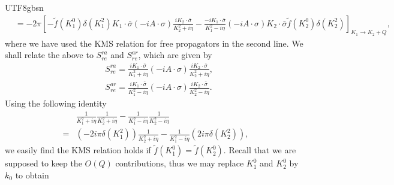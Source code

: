 \documentclass[11pt]{article}\def\baselinestretch{1.4}
\def\d{{\delta}}
\def\h{\eta}
\def\p{{\pi}}
\def\s{{\sigma}}
\def\({\left(}
\def\){\right)}
\begin{document}
\begin{CJK}{UTF8}{gbsn}
\begin{align}
&=-2\p\left[-\tilde{f}(K_1^0)\d(K_1^2)K_1\cdot\bar{\s}(-iA\cdot \sigma )\frac{iK_2\cdot \bar{\sigma }}{K_2^2+i \eta }-\frac{-iK_1\cdot \bar{\sigma }}{K_1^2-i \eta }(-iA\cdot \sigma )K_2\cdot\bar{\s}\tilde{f}(K_2^0)\d(K_2^2)\right]_{K_1\to K_2+Q},
\end{align}
where we have used the KMS relation for free propagators in the second line.
We shall relate the above to $S_{re}^{ra}$ and $S_{re}^{ar}$, which are given by
\begin{align}
&S_{re}^{ra}=\frac{iK_1\cdot\bar{\s}}{K_1^2+i\h}(-iA\cdot\s)\frac{iK_2\cdot\bar{\s}}{K_2^2+i\h},\nonumber\\
&S_{re}^{ar}=\frac{iK_1\cdot\bar{\s}}{K_1^2-i\h}(-iA\cdot\s)\frac{iK_2\cdot\bar{\s}}{K_2^2-i\h}.
\end{align}
Using the following identity
\begin{align}
&\frac{1}{K_1^2+i\h}\frac{1}{K_2^2+i\h}-\frac{1}{K_1^2-i\h}\frac{1}{K_2^2-i\h}\nonumber\\
=&\(-2i\p\d(K_1^2)\)\frac{1}{K_2^2+i\h}-\frac{1}{K_1^2-i\h}\(2i\p\d(K_2^2)\),
\end{align}
we easily find the KMS relation holds if $\tilde{f}(K_1^0)=\tilde{f}(K_2^0)$. Recall that we are supposed to keep the $O(Q)$ contributions, thus we may replace $K_1^0$ and $K_2^0$ by $k_0$ to obtain

\end{CJK}
\end{document}
